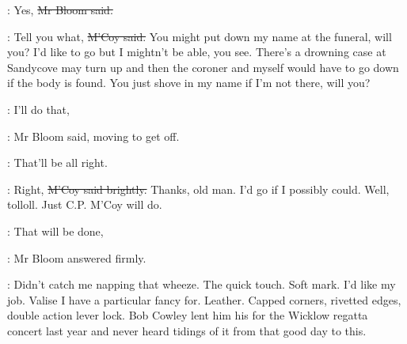 \Bloom:
Yes,
\sout{Mr Bloom said.}

\mccoy:
Tell you what,
\sout{M'Coy said.}
You might put down my name at the funeral,
will you?
I'd like to go but I mightn't be able, you see.
There's a drowning case at Sandycove may turn up
and then the coroner and myself would have to go down
if the body is found.
You just shove in my name if I'm not there,
will you?

\Bloom:
I'll do that,

:
Mr Bloom said,
moving to get off.

\Bloom:
That'll be all right.

\mccoy:
Right,
\sout{M'Coy said brightly.}
Thanks, old man.
I'd go if I possibly could.
Well, tolloll.
Just C.P. M'Coy will do.

\Bloom:
That will be done,

:
Mr Bloom answered firmly.

\BloomInt:
Didn't catch me napping that wheeze.
The quick touch.
Soft mark.
I'd like my job.
Valise I have a particular fancy for.
Leather.
Capped corners,
rivetted edges,
double action lever lock.
Bob Cowley lent him his for the Wicklow regatta concert last year
and never heard tidings of it from that good day to this.
